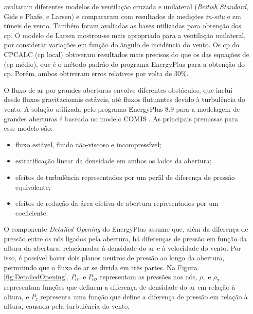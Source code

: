 \documentclass[brazil,hardcopy,openany]{ufscthesis} %
\begin{document}
 avaliaram diferentes modelos de ventilação cruzada e unilateral (\textit{British Standard}, Gids e Phafe, e Larsen) e compararam com resultados de medições \textit{in-situ} e em túneis de vento. Também foram avaliadas as bases utilizadas para obtenção dos \acrshort{cp}. 
O modelo de Larsen mostrou-se mais apropriado para a ventilação unilateral, por considerar variações em função do ângulo de incidência do vento. Os \acrshort{cp} do CPCALC (\acrshort{cp} local) obtiveram resultados mais precisos do que os das equações de  (\acrshort{cp} médio), que é o método padrão do programa EnergyPlus \cite{EnergyPlus2018} para a obtenção do \acrshort{cp}. Porém, ambos obtiveram erros relativos por volta de 30\%.

O fluxo de ar por grandes aberturas envolve diferentes obstáculos, que inclui desde fluxos gravitacionais estáveis, até fluxos flutuantes devido à turbulência do vento. A solução utilizada pelo programa EnergyPlus 8.9 \cite{EnergyPlus2018} para a modelagem de grandes aberturas é baseada no modelo COMIS \cite{Feustel1990}. As principais premissas para esse modelo são:

\begin{itemize}
	\item fluxo estável, fluido não-viscoso e incompressível;
	\item estratificação linear da densidade em ambos os lados da abertura;
	\item efeitos de turbulência representados por um perfil de diferença de pressão equivalente;
	\item efeitos de redução da área efetiva de abertura representados por um coeficiente.
\end{itemize}

O componente \textit{Detailed Opening} do EnergyPlus \cite{EnergyPlus2018} assume que, além da diferença de pressão entre os nós ligados pela abertura, há diferenças de pressão em função da altura da abertura, relacionadas à densidade do ar e à velocidade do vento. Por isso, é possível haver dois planos neutros de pressão ao longo da abertura, permitindo que o fluxo de ar se divida em três partes. 
Na Figura \ref{fig:DetailedOpening}, $P_{01}$ e $P_{02}$ representam as pressões nos nós, $\rho_{1}$ e $\rho_{2}$ representam funções que definem a diferença de densidade do ar em relação à altura, e $P_z$ representa uma função que define a diferença de pressão em relação à altura, causada pela turbulência do vento.
\end{document}

